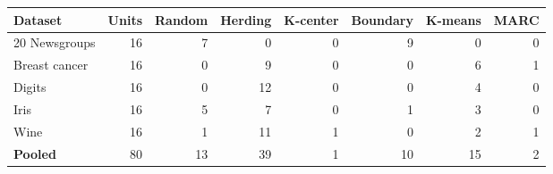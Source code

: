 \begin{tabular}{lrrrrrrr}
\toprule
Dataset & Units & Random & Herding & K-center & Boundary & K-means & MARC \\
\midrule
20 Newsgroups & 16 & 7 & 0 & 0 & 9 & 0 & 0 \\
Breast cancer & 16 & 0 & 9 & 0 & 0 & 6 & 1 \\
Digits & 16 & 0 & 12 & 0 & 0 & 4 & 0 \\
Iris & 16 & 5 & 7 & 0 & 1 & 3 & 0 \\
Wine & 16 & 1 & 11 & 1 & 0 & 2 & 1 \\
\textbf{Pooled} & 80 & 13 & 39 & 1 & 10 & 15 & 2 \\
\bottomrule
\end{tabular}
